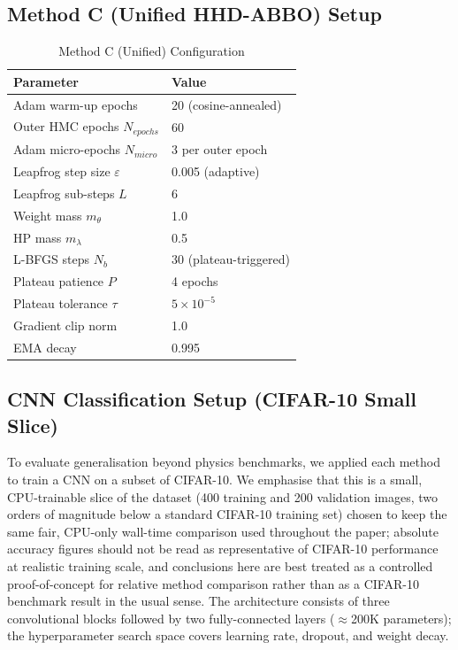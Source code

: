 \documentclass[11pt]{article}
\theoremstyle{definition}
\begin{document}
\subsection{Method C (Unified HHD-ABBO) Setup}
\begin{table}[H]
\centering
\caption{Method C (Unified) Configuration}
\label{tab:setup_c}
\renewcommand{\arraystretch}{1.2}
\begin{tabular}{ll}
\toprule
Parameter & Value \\
\midrule
Adam warm-up epochs              & 20 (cosine-annealed) \\
Outer HMC epochs $N_{epochs}$   & 60 \\
Adam micro-epochs $N_{micro}$   & 3 per outer epoch \\
Leapfrog step size $\varepsilon$ & 0.005 (adaptive) \\
Leapfrog sub-steps $L$          & 6 \\
Weight mass $m_\theta$           & 1.0 \\
HP mass $m_\lambda$              & 0.5 \\
L-BFGS steps $N_b$               & 30 (plateau-triggered) \\
Plateau patience $P$             & 4 epochs \\
Plateau tolerance $\tau$         & $5 \times 10^{-5}$ \\
Gradient clip norm               & 1.0 \\
EMA decay                        & 0.995 \\
\bottomrule
\end{tabular}
\end{table}

\subsection{CNN Classification Setup (CIFAR-10 Small Slice)}

To evaluate generalisation beyond physics benchmarks, we applied
each method to train a CNN on a subset of CIFAR-10. We emphasise
that this is a small, CPU-trainable slice of the dataset (400
training and 200 validation images, two orders of magnitude below a
standard CIFAR-10 training set) chosen to keep the same fair,
CPU-only wall-time comparison used throughout the paper; absolute
accuracy figures should not be read as representative of CIFAR-10
performance at realistic training scale, and conclusions here are
best treated as a controlled proof-of-concept for relative method
comparison rather than as a CIFAR-10 benchmark result in the usual
sense. The architecture
consists of three convolutional blocks followed by two
fully-connected layers ($\approx$200K parameters); the hyperparameter
search space covers learning rate, dropout, and weight decay.
\end{document}
